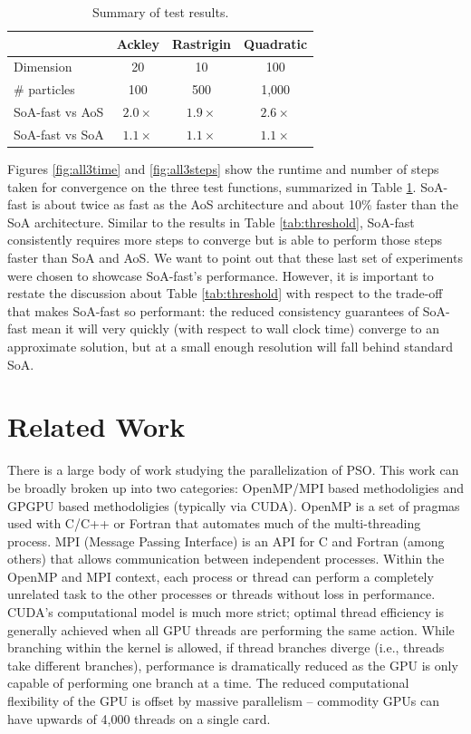 \begin{table}
  \centering
  \caption{Summary of test results.}
  \label{tab:results}
  \begin{tabular}{lccc}\toprule
    & \textbf{Ackley} & \textbf{Rastrigin} & \textbf{Quadratic}\\\midrule
    Dimension & 20 & 10 & 100\\
    \# particles & 100 & 500 & 1,000\\
    SoA-fast vs AoS & $2.0\times$ & $1.9\times$ & $2.6\times$\\
    SoA-fast vs SoA & $1.1\times$ & $1.1\times$ & $1.1\times$\\\bottomrule
  \end{tabular}
\end{table}

Figures \ref{fig:all3time} and \ref{fig:all3steps} show the runtime and number
of steps taken for convergence on the three test functions, summarized in Table
\ref{tab:results}.
SoA-fast is about twice as fast as the AoS architecture and
about 10\% faster than the SoA architecture. Similar to the results in Table
\ref{tab:threshold}, SoA-fast consistently requires more steps to converge but
is able to perform those steps faster than SoA and AoS. We want to point out
that these last set of experiments were chosen to showcase SoA-fast's performance.
However, it is important to restate the discussion about Table \ref{tab:threshold}
with respect to the trade-off that makes SoA-fast so performant: the reduced
consistency guarantees of SoA-fast mean it will very quickly (with respect to
wall clock time) converge to an approximate solution, but at a small enough
resolution will fall behind standard SoA.

\section{Related Work}\label{sec:prior}
There is a large body of work studying the parallelization of PSO. This work can
be broadly broken up into two categories: OpenMP/MPI based methodoligies and
GPGPU based methodoligies (typically via CUDA). OpenMP is a set of pragmas used
with C/C++ or Fortran that automates much of the multi-threading process. MPI
(Message Passing Interface) is an API for C and Fortran (among others) that
allows communication between independent processes. Within the OpenMP and MPI
context, each process or thread can perform a completely unrelated task to the
other processes or threads without loss in performance. CUDA's computational
model is much more strict; optimal thread efficiency is generally achieved when
all GPU threads are performing the same action. While branching within the
kernel is allowed, if thread branches diverge (i.e., threads take different
branches), performance is dramatically reduced as the GPU is only capable of
performing one branch at a time. The reduced computational flexibility of the
GPU is offset by massive parallelism -- commodity GPUs can have upwards of 4,000
threads on a single card.

